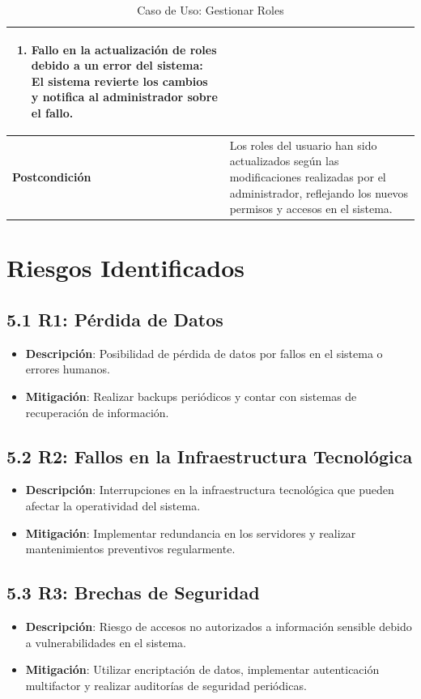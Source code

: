 \documentclass{article}
\begin{document}
\begin{table}[H]
\begin{tabular}{|p{4cm}|p{11cm}|}
\begin{enumerate}
        \item Fallo en la actualización de roles debido a un error del sistema: El sistema revierte los cambios y notifica al administrador sobre el fallo.
    \end{enumerate} \\ \hline
    \textbf{Postcondición}      & Los roles del usuario han sido actualizados según las modificaciones realizadas por el administrador, reflejando los nuevos permisos y accesos en el sistema. \\ \hline
    \end{tabular}
    \caption{Caso de Uso: Gestionar Roles}
    \label{tab:gestionar_roles}
\end{table}

\newpage
\section{Riesgos Identificados}

\subsection{5.1 R1: Pérdida de Datos}
\begin{itemize}
    \item \textbf{Descripción}: Posibilidad de pérdida de datos por fallos en el sistema o errores humanos.
    \item \textbf{Mitigación}: Realizar backups periódicos y contar con sistemas de recuperación de información.
\end{itemize}

\subsection{5.2 R2: Fallos en la Infraestructura Tecnológica}
\begin{itemize}
    \item \textbf{Descripción}: Interrupciones en la infraestructura tecnológica que pueden afectar la operatividad del sistema.
    \item \textbf{Mitigación}: Implementar redundancia en los servidores y realizar mantenimientos preventivos regularmente.
\end{itemize}

\subsection{5.3 R3: Brechas de Seguridad}
\begin{itemize}
    \item \textbf{Descripción}: Riesgo de accesos no autorizados a información sensible debido a vulnerabilidades en el sistema.
    \item \textbf{Mitigación}: Utilizar encriptación de datos, implementar autenticación multifactor y realizar auditorías de seguridad periódicas.
\end{itemize}
\end{document}
